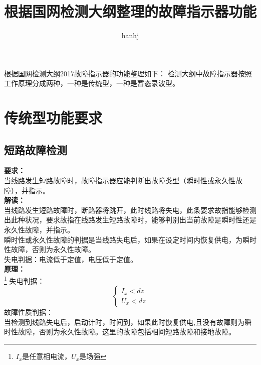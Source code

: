 \documentclass{article}
\begin{document}
\begin{CJK}{UTF8}{gbsn}
\title{根据国网检测大纲整理的故障指示器功能}
\author{hanhj}
\maketitle
\newpage
\tableofcontents
\newpage
根据国网检测大纲2017故障指示器的功能整理如下：
检测大纲中故障指示器按照工作原理分成两种，一种是传统型，一种是暂态录波型。
\section{传统型功能要求}
\subsection{短路故障检测}
\par
	\textbf{要求：}\\当线路发生短路故障时，故障指示器应能判断出故障类型（瞬时性或永久性故障），并指示。\\
	\textbf{解读：}\\当线路发生短路故障时，断路器将跳开，此时线路将失电，此条要求故指能够检测出此种状况，要求故指在线路发生短路故障时，能够判别出当前故障是瞬时性还是永久性故障，并指示。\\
	瞬时性或永久性故障的判据是当线路失电后，如果在设定时间内恢复供电，为瞬时性故障，否则为永久性故障。\\
	失电判据：电流低于定值，电压低于定值。\\
	\textbf{原理：}\\
	\footnote{$I_x$是任意相电流，$U_x$是场强}
	失电判据：\\
	\[
		\left\{ 
			\begin{array}{ll}
				I_x<dz\\
				U_x<dz 
			\end{array}
		\right.
	\]
	故障性质判据：\\
		当检测到线路失电后，启动计时，时间到，如果此时恢复供电,且没有故障则为瞬时性故障，否则为永久性故障。这里的故障包括相间短路故障和接地故障。

\end{CJK}
\end{document}
